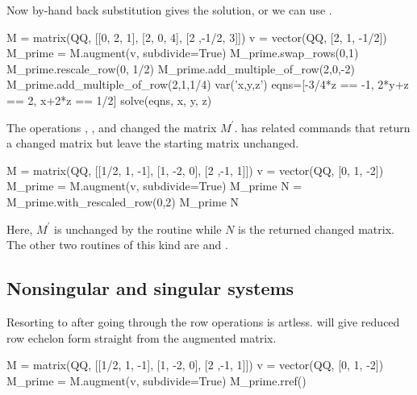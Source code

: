 Now by-hand back substitution gives the solution, or we can 
use .
\begin{sageoutput}[d,0,7]
M = matrix(QQ, [[0, 2, 1], [2, 0, 4], [2 ,-1/2, 3]])
v = vector(QQ, [2, 1, -1/2])                        
M_prime = M.augment(v, subdivide=True)              
M_prime.swap_rows(0,1)
M_prime.rescale_row(0, 1/2)
M_prime.add_multiple_of_row(2,0,-2)
M_prime.add_multiple_of_row(2,1,1/4)
var('x,y,z')
eqns=[-3/4*z == -1, 2*y+z == 2, x+2*z == 1/2]
solve(eqns, x, y, z)
\end{sageoutput}

The operations ,
, and 
changed the matrix $M^\prime$.
\Sage{} has related commands that return a changed matrix
but leave the starting matrix unchanged.
\begin{sageoutput}
M = matrix(QQ, [[1/2, 1, -1], [1, -2, 0], [2 ,-1, 1]])
v = vector(QQ, [0, 1, -2])
M_prime = M.augment(v, subdivide=True) 
M_prime
N = M_prime.with_rescaled_row(0,2)
M_prime
N      
\end{sageoutput}
\noindent
Here, $M^\prime$ is unchanged by the routine while $N$ is the returned 
changed matrix.
The other two routines of this kind are  
and .




\subsection{Nonsingular and singular systems}
Resorting to  after going through the row operations is artless.
\Sage{} will give reduced row echelon form straight from the augmented matrix.
\begin{sageoutput}
M = matrix(QQ, [[1/2, 1, -1], [1, -2, 0], [2 ,-1, 1]])
v = vector(QQ, [0, 1, -2])
M_prime = M.augment(v, subdivide=True) 
M_prime.rref()
\end{sageoutput}


